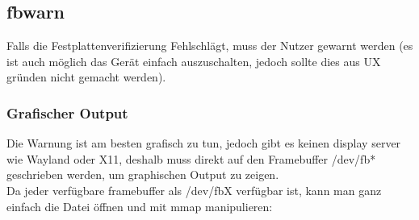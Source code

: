 \subsection{fbwarn}
Falls die Festplattenverifizierung Fehlschlägt, muss der Nutzer gewarnt werden (es ist auch möglich das Gerät einfach auszuschalten, jedoch sollte dies aus UX gründen nicht gemacht werden).

\subsubsection{Grafischer Output}
Die Warnung ist am besten grafisch zu tun, jedoch gibt es keinen display server wie Wayland oder X11, deshalb muss direkt auf den Framebuffer /dev/fb* geschrieben werden, um graphischen Output zu zeigen.\\
Da jeder verfügbare framebuffer als /dev/fbX verfügbar ist, kann man ganz einfach die Datei öffnen und mit mmap manipulieren:

